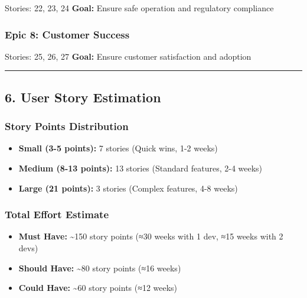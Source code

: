 \documentclass[
]{article}
\providecommand{\tightlist}{%
  \setlength{\itemsep}{0pt}\setlength{\parskip}{0pt}}
\begin{document}
Stories: 22, 23, 24 \textbf{Goal:} Ensure safe operation and regulatory
compliance

\hypertarget{epic-8-customer-success}{%
\subsubsection{Epic 8: Customer Success}\label{epic-8-customer-success}}

Stories: 25, 26, 27 \textbf{Goal:} Ensure customer satisfaction and
adoption

\begin{center}\rule{0.5\linewidth}{0.5pt}\end{center}

\hypertarget{user-story-estimation}{%
\subsection{6. User Story Estimation}\label{user-story-estimation}}

\hypertarget{story-points-distribution}{%
\subsubsection{Story Points
Distribution}\label{story-points-distribution}}

\begin{itemize}
\tightlist
\item
  \textbf{Small (3-5 points):} 7 stories (Quick wins, 1-2 weeks)
\item
  \textbf{Medium (8-13 points):} 13 stories (Standard features, 2-4
  weeks)
\item
  \textbf{Large (21 points):} 3 stories (Complex features, 4-8 weeks)
\end{itemize}

\hypertarget{total-effort-estimate}{%
\subsubsection{Total Effort Estimate}\label{total-effort-estimate}}

\begin{itemize}
\tightlist
\item
  \textbf{Must Have:} \textasciitilde150 story points (≈30 weeks with 1
  dev, ≈15 weeks with 2 devs)
\item
  \textbf{Should Have:} \textasciitilde80 story points (≈16 weeks)
\item
  \textbf{Could Have:} \textasciitilde60 story points (≈12 weeks)
\end{itemize}
\end{document}
